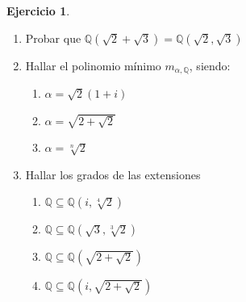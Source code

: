 \documentclass[10pt, spanish]{report}
\theoremstyle{definition}
\newtheorem*{ejer}{Ejercicio}
\newcommand{\Q}{\mathbb{Q}}
\begin{document}
\begin{ejer}\hspace{0pt}
    \begin{enumerate}
        \item Probar que $\Q(\sqrt{2}+\sqrt{3})=\Q(\sqrt{2},\sqrt{3})$
        \item Hallar el polinomio mínimo $m_{\alpha,\Q}$, siendo:
            \begin{multicols}{4}
                \begin{enumerate}
                    \item $\alpha=\sqrt{2}(1+i)$
                    \item $\alpha=\sqrt{2+\sqrt{2}}$
                    \item $\alpha=\sqrt[n]{2}$
                \end{enumerate}
            \end{multicols}
        \item Hallar los grados de las extensiones
            \begin{multicols}{2}
                \begin{enumerate}
                    \item $\Q\subseteq\Q(i,\sqrt[4]{2})$
                    \item $\Q\subseteq\Q\left(\sqrt{3},\sqrt[3]{2}\right)$
                    \item $\Q\subseteq\Q\left(\sqrt{2+\sqrt{2}}\right)$
                    \item $\Q\subseteq\Q\left(i,\sqrt{2+\sqrt{2}}\right)$
                \end{enumerate}
            \end{multicols}
    \end{enumerate}
\end{ejer}
\end{document}
